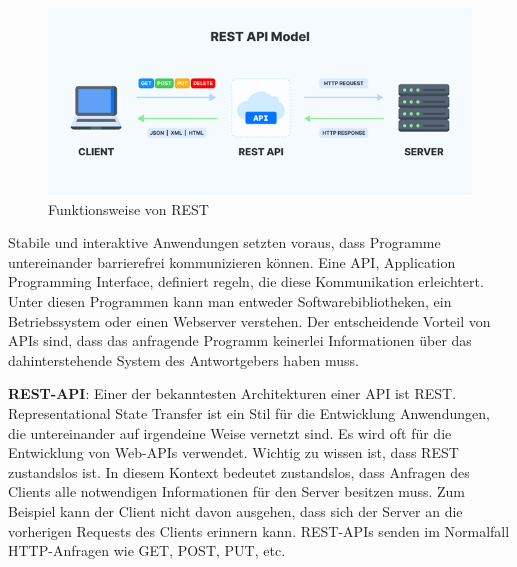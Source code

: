 \begin{figure}[h]
    \centering
    \includegraphics[scale=0.9]{sections/cloud-computing/images/rest-api.png}
    \caption{Funktionsweise von REST}
    \label{fig:ai-builder-tagging-figure}
\end{figure}

Stabile und interaktive Anwendungen setzten voraus, dass Programme untereinander barrierefrei kommunizieren können. Eine API, Application Programming Interface, definiert regeln, die diese Kommunikation erleichtert. Unter diesen Programmen kann man entweder Softwarebibliotheken, ein Betriebssystem oder einen Webserver verstehen.
Der entscheidende Vorteil von APIs sind, dass das anfragende Programm keinerlei Informationen über das dahinterstehende System des Antwortgebers haben muss.

\textbf{REST-API}: Einer der bekanntesten Architekturen einer API ist REST. Representational State Transfer ist ein Stil für die Entwicklung Anwendungen, die untereinander auf irgendeine Weise vernetzt sind. Es wird oft für die Entwicklung von Web-APIs verwendet.
Wichtig zu wissen ist, dass REST zustandslos ist. In diesem Kontext bedeutet zustandslos, dass Anfragen des Clients alle notwendigen Informationen für den Server besitzen muss. Zum Beispiel kann der Client nicht davon ausgehen, dass sich der Server an die vorherigen Requests des Clients erinnern kann.
REST-APIs senden im Normalfall HTTP-Anfragen wie GET, POST, PUT, etc.
